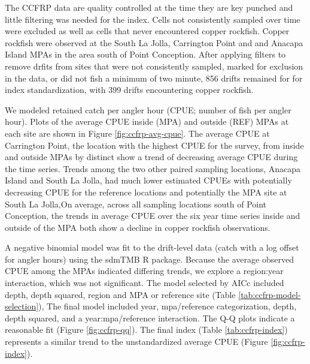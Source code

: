 \documentclass[11pt,
  english,
  letterpaper,
]{article}
\begin{document}
The CCFRP data are quality controlled at the time they are key punched and little filtering was needed for the index. Cells not consistently sampled over time were excluded as well as cells that never encountered copper rockfish. Copper rockfish were observed at the South La Jolla, Carrington Point and and Anacapa Island MPAs in the area south of Point Conception. After applying filters to remove drfits from sites that were not consistently sampled, marked for exclusion in the data, or did not fish a minimum of two minute, 856 drifts remained for for index standardization, with 399 drifts encountering copper rockfish.

We modeled retained catch per angler hour (CPUE; number of fish per angler hour). Plots of the average CPUE inside (MPA) and outside (REF) MPAs at each site are shown in Figure \ref{fig:ccfrp-avg-cpue}. The average CPUE at Carrington Point, the location with the highest CPUE for the survey, from inside and outside MPAs by distinct show a trend of decreasing average CPUE during the time series. Trends among the two other paired sampling locations, Anacapa Island and South La Jolla, had much lower estimated CPUEs with potentially decreasing CPUE for the reference locations and potentially the MPA site at South La Jolla,On average, across all sampling locations south of Point Conception, the trends in average CPUE over the six year time series inside and outside of the MPA both show a decline in copper rockfish observations.

A negative binomial model was fit to the drift-level data (catch with a log offset for angler hours) using the sdmTMB R package. Because the average observed CPUE among the MPAs indicated differing trends, we explore a region:year interaction, which was not significant. The model selected by AICc included depth, depth squared, region and MPA or reference site (Table \ref{tab:ccfrp-model-selection}), The final model included year, mpa/reference categorization, depth, depth squared, and a year:mpa/reference interaction. The Q-Q plots indicate a reasonable fit (Figure \ref{fig:ccfrp-qq}). The final index (Table \ref{tab:ccfrp-index}) represents a similar trend to the unstandardized average CPUE (Figure \ref{fig:ccfrp-index}).
\end{document}
